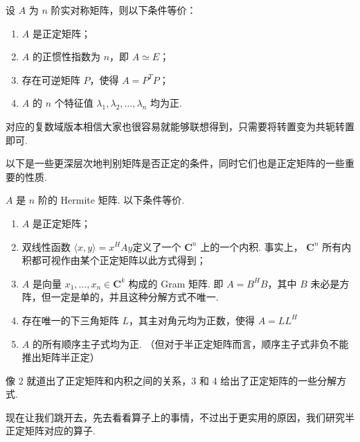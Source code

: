 \begin{theorem}
    设 $ A $ 为 $ n $ 阶实对称矩阵，则以下条件等价：
    \begin{enumerate}
        \item $ A $ 是正定矩阵；

        \item $ A $ 的正惯性指数为 $ n $，即 $ A \simeq E $；

        \item 存在可逆矩阵 $ P $，使得 $ A = P^{T}P $；

        \item $ A $ 的 $ n $ 个特征值 $ \lambda_1, \lambda_2, \ldots, \lambda_n $ 均为正.
    \end{enumerate}
\end{theorem}

对应的复数域版本相信大家也很容易就能够联想得到，只需要将转置变为共轭转置即可.

以下是一些更深层次地判别矩阵是否正定的条件，同时它们也是正定矩阵的一些重要的性质.

\begin{theorem}
    $ A $ 是 $ n $ 阶的 Hermite 矩阵. 以下条件等价.
    \begin{enumerate}
        \item $ A $ 是正定矩阵；

        \item 双线性函数 $ \langle x, y \rangle = x^{H}Ay $定义了一个 $ \mathbf{C}^n $ 上的一个内积. 事实上， $ \mathbf{C}^n $ 所有内积都可视作由某个正定矩阵以此方式得到；

        \item $ A $ 是向量 $ x_1, \ldots , x_n \in \mathbf{C}^k $ 构成的
              Gram 矩阵. 即 $ A = B^{H}B $，其中 $ B $ 未必是方阵，但一定是单的，并且这种分解方式不唯一.

        \item {} 存在唯一的下三角矩阵 $ L $，其主对角元均为正数，使得 $ A = LL^{H} $

        \item {} $ A $ 的所有顺序主子式均为正. （但对于半正定矩阵而言，顺序主子式非负不能推出矩阵半正定）
    \end{enumerate}
\end{theorem}

像 2 就道出了正定矩阵和内积之间的关系，3 和 4 给出了正定矩阵的一些分解方式.

现在让我们跳开去，先去看看算子上的事情，不过出于更实用的原因，我们研究半正定矩阵对应的算子.

